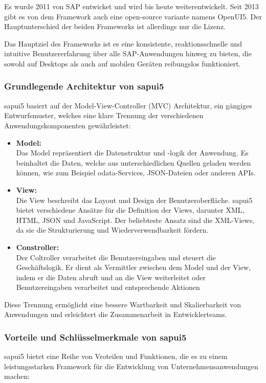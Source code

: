 Es wurde 2011 von SAP entwicket und wird bis heute weiterentwickelt. Seit 2013 gibt es von dem Framework auch eine open-source variante namens OpenUI5. Der Hauptunterschied der beiden Frameworks ist allerdings nur die Lizenz.

Das Hauptziel des Frameworks ist es eine konsistente, reaktionsschnelle und intuitive Benutzererfahrung über alle SAP-Anwendungen hinweg zu bieten, die sowohl auf Desktops als auch auf mobilen Geräten reibungslos funktioniert.

\subsubsection[Grundlegende Architektur von \gls{sapui5}]{Grundlegende Architektur von \gls{sapui5}}
\gls{sapui5} basiert auf der Model-View-Controller (MVC) Architektur, ein gängiges Entwurfsmuster, welches eine klare Trennung der verschiedenen Anwendungskomponenten gewährleistet:
\begin{itemize}
    \item \textbf{Model:} \\
    Das Model repräsentiert die Datenstruktur und -logik der Anwendung. Es beinhaltet die Daten, welche aus unterschiedlichen Quellen geladen werden können, wie zum Beispiel \gls{odata}-Services, JSON-Dateien oder anderen APIs.
    \item \textbf{View:} \\
    Die View beschreibt das Layout und Design der Benutzeroberfläche. \gls{sapui5} bietet verschiedene Ansätze für die Definition der Views, darunter XML, HTML, JSON und JavaScript.
    Der beliebteste Ansatz sind die XML-Views, da sie die Strukturierung und Wiederverwendbarkeit fördern.
    \item \textbf{Constroller:} \\
    Der Coltroller verarbeitet die Benutzereingaben und steuert die Geschäftslogik.
    Er dient als Vermittler zwischen dem Model und der View, indem er die Daten abruft und an die View weiterleitet oder Benutzereingaben verarbeitet und entsprechende Aktionen 
\end{itemize}

Diese Trennung ermöglicht eine bessere Wartbarkeit und Skalierbarkeit von Anwendungen und erleichtert die Zusammenarbeit in Entwicklerteams.

\subsubsection[Vorteile und Schlüsselmerkmale von \gls{sapui5}]{Vorteile und Schlüsselmerkmale von \gls{sapui5}}
\gls{sapui5} bietet eine Reihe von Vroteilen und Funktionen, die es zu einem leistungsstarken Framework für die Entwicklung von Unternehmensanwendungen machen:

